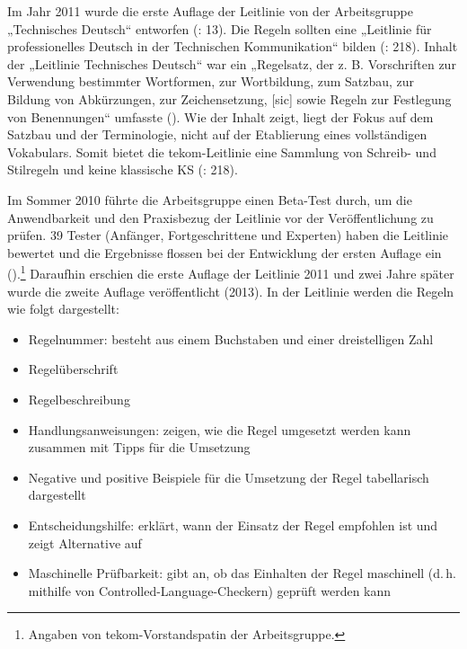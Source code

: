 Im Jahr 2011 wurde die erste Auflage der Leitlinie von der Arbeitsgruppe „Technisches Deutsch“ entworfen (\citealt{tekom2013}: 13). Die Regeln sollten eine „Leitlinie für professionelles Deutsch in der Technischen Kommunikation“ bilden (\citealt{DrewerZiegler2014}: 218). Inhalt der „Leitlinie Technisches Deutsch“ war ein „Regelsatz, der z. B. Vorschriften zur Verwendung bestimmter Wortformen, zur Wortbildung, zum Satzbau, zur Bildung von Abkürzungen, zur Zeichensetzung, [sic] sowie Regeln zur Festlegung von Benennungen“ umfasste (\citealt{tekom2009}). Wie der Inhalt zeigt, liegt der Fokus auf dem Satzbau und der Terminologie, nicht auf der Etablierung eines vollständigen Vokabulars. Somit bietet die tekom-Leitlinie eine Sammlung von Schreib- und Stilregeln und keine klassische KS (\citealt{DrewerZiegler2014}: 218).

Im Sommer 2010 führte die Arbeitsgruppe einen Beta-Test durch, um die Anwendbarkeit und den Praxisbezug der Leitlinie vor der Veröffentlichung zu prüfen. 39 Tester (Anfänger, Fortgeschrittene und Experten) haben die Leitlinie bewertet und die Ergebnisse flossen bei der Entwicklung der ersten Auflage ein (\citealt{Fleurynodate}).\footnote{{{{Angaben von \citet{Fleurynodate} tekom-Vorstandspatin der Arbeitsgruppe.}}}} Daraufhin erschien die erste Auflage der Leitlinie 2011 und zwei Jahre später wurde die zweite Auflage veröffentlicht (2013). In der Leitlinie werden die Regeln wie folgt dargestellt:

\begin{itemize}
\item Regelnummer: besteht aus einem Buchstaben und einer dreistelligen Zahl

\item Regelüberschrift

\item Regelbeschreibung

\item Handlungsanweisungen: zeigen, wie die Regel umgesetzt werden kann zusammen mit Tipps für die Umsetzung

\item Negative und positive Beispiele für die Umsetzung der Regel tabellarisch dargestellt

\item Entscheidungshilfe: erklärt, wann der Einsatz der Regel empfohlen ist und zeigt Alternative auf

\item Maschinelle Prüfbarkeit: gibt an, ob das Einhalten der Regel maschinell (d.\,h. mithilfe von Controlled-Language-Checkern) geprüft werden kann

\end{itemize}

